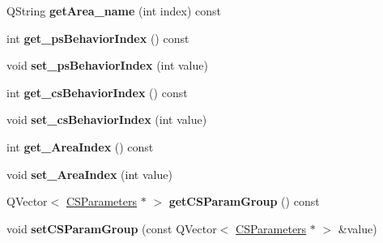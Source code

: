 \begin{DoxyCompactItemize}
\item 
Q\+String {\bfseries get\+Area\+\_\+name} (int index) const \hypertarget{class_tuningtraffic_acfbc63e1f07450873293f5005ddc8a60}{}\label{class_tuningtraffic_acfbc63e1f07450873293f5005ddc8a60}

\item 
int {\bfseries get\+\_\+ps\+Behavior\+Index} () const \hypertarget{class_tuningtraffic_a1596abb4f352ac5d2ad1d03e6dd67a2a}{}\label{class_tuningtraffic_a1596abb4f352ac5d2ad1d03e6dd67a2a}

\item 
void {\bfseries set\+\_\+ps\+Behavior\+Index} (int value)\hypertarget{class_tuningtraffic_a5db0ab67c6b13d4d3e3842c2fa9fb181}{}\label{class_tuningtraffic_a5db0ab67c6b13d4d3e3842c2fa9fb181}

\item 
int {\bfseries get\+\_\+cs\+Behavior\+Index} () const \hypertarget{class_tuningtraffic_aaf8646a94245bca385f480ad839cda5e}{}\label{class_tuningtraffic_aaf8646a94245bca385f480ad839cda5e}

\item 
void {\bfseries set\+\_\+cs\+Behavior\+Index} (int value)\hypertarget{class_tuningtraffic_a1ec2964a2d9df8d55042f32ea55d5cf8}{}\label{class_tuningtraffic_a1ec2964a2d9df8d55042f32ea55d5cf8}

\item 
int {\bfseries get\+\_\+\+Area\+Index} () const \hypertarget{class_tuningtraffic_a12d85037f8a5f276de67895cc3840dbb}{}\label{class_tuningtraffic_a12d85037f8a5f276de67895cc3840dbb}

\item 
void {\bfseries set\+\_\+\+Area\+Index} (int value)\hypertarget{class_tuningtraffic_aa8c9a785cbbba24513fd13b514b11950}{}\label{class_tuningtraffic_aa8c9a785cbbba24513fd13b514b11950}

\item 
Q\+Vector$<$ \hyperlink{struct_tuningtraffic_1_1_c_s_parameters}{C\+S\+Parameters} $\ast$ $>$ {\bfseries get\+C\+S\+Param\+Group} () const \hypertarget{class_tuningtraffic_a084e4bcf8fcd9897f9ceaf08f49e2d93}{}\label{class_tuningtraffic_a084e4bcf8fcd9897f9ceaf08f49e2d93}

\item 
void {\bfseries set\+C\+S\+Param\+Group} (const Q\+Vector$<$ \hyperlink{struct_tuningtraffic_1_1_c_s_parameters}{C\+S\+Parameters} $\ast$ $>$ \&value)\hypertarget{class_tuningtraffic_a0caf895c323f49803cf9aae89514d639}{}\label{class_tuningtraffic_a0caf895c323f49803cf9aae89514d639}


\end{DoxyCompactItemize}
